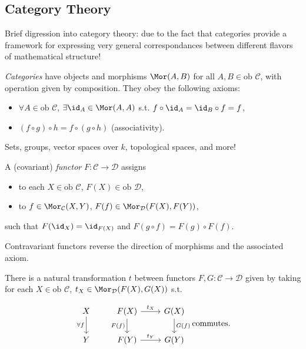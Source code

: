 \documentclass{notes}
\begin{document}
\subsection{Category Theory}

Brief digression into category theory: due to the fact that categories provide a framework for expressing very general correspondances between different flavors of mathematical structure!

\begin{defn}
    \emph{Categories} have objects and morphisms $\Mor (A,B)$ for all $A,B\in \text{ob }\mathcal{C} $, with operation given by composition. They obey the following axioms:
    \begin{itemize}
        \item $\forall A\in \text{ob }\mathcal{C}$, $\exists \id _A\in \Mor (A,A)$ s.t. $f\circ \id _A=\id _B\circ f=f$,
        \item $(f\circ g)\circ h=f\circ(g\circ h)$ (associativity). 
    \end{itemize}
\end{defn}

\begin{example}
    Sets, groups, vector spaces over $k$, topological spaces, and more!
\end{example}

\begin{defn}
    A (covariant) \emph{functor} $F\colon \mathcal{C}  \to \mathcal{D}  $ assigns
    \begin{itemize}
        \item to each $X\in \text{ob }\mathcal{C}$, $F(X)\in \text{ob }\mathcal{D} $,
        \item to $f\in \Mor _{\mathcal{C} }(X,Y)$, $F(f)\in \Mor _{\mathcal{D} }(F(X),F(Y))$,
    \end{itemize}

    such that $F(\id _X)=\id _{F(X)}$ and $F(g\circ f)=F(g)\circ F(f)$.
    
    Contravariant functors reverse the direction of morphisms and the associated axiom.
\end{defn}

\begin{theorem}
    There is a natural transformation $t$ between functors $F,G\colon \mathcal{C}  \to \mathcal{D}  $ given by taking for each $X\in \text{ob }\mathcal{C} $, $t_X\in \Mor _{\mathcal{D}}(F(X),G(X))$ s.t.

    \[\begin{tikzcd}
	X & {F(X)} & {G(X)} \\
	Y & {F(Y)} & {G(Y)}
	\arrow["{\forall f}"', from=1-1, to=2-1]
	\arrow["{t_X}", from=1-2, to=1-3]
	\arrow["{t_Y}", from=2-2, to=2-3]
	\arrow["{G(f)}", from=1-3, to=2-3]
	\arrow["{F(f)}"', from=1-2, to=2-2]
    \end{tikzcd} \text{commutes.}\]
\end{theorem}
\end{document}
